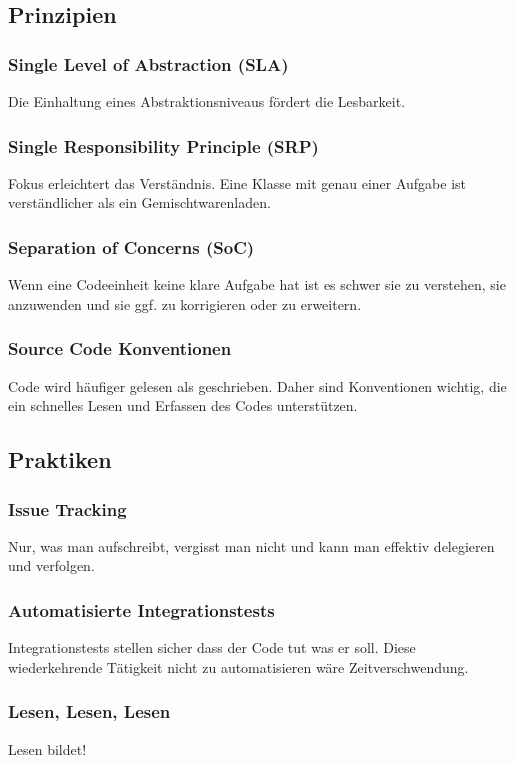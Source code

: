 \documentclass[a5paper, landscape,11pt]{article}
\begin{document}
	\newpage
	\begin{minipage}[t]{.5\textwidth}
		\subsection*{Prinzipien}
		\subsubsection*{Single Level of Abstraction (SLA)}
		Die Einhaltung eines Abstraktionsniveaus fördert die Lesbarkeit.
		\subsubsection*{Single Responsibility Principle (SRP)}
		Fokus erleichtert das Verständnis. Eine Klasse mit genau einer Aufgabe ist verständlicher als ein Gemischtwarenladen.
		\subsubsection*{Separation of Concerns (SoC)}
		Wenn eine Codeeinheit keine klare Aufgabe hat ist es schwer sie zu verstehen, sie anzuwenden und sie ggf. zu korrigieren oder zu erweitern.
		\subsubsection*{Source Code Konventionen}
		Code wird häufiger gelesen als geschrieben. Daher sind Konventionen wichtig, die ein schnelles Lesen und Erfassen des Codes unterstützen.
	\end{minipage}
	\hspace{0.5cm}
	\begin{minipage}[t]{.5\textwidth}
		\subsection*{Praktiken}
		\subsubsection*{Issue Tracking}
		Nur, was man aufschreibt, vergisst man nicht und kann man effektiv delegieren und verfolgen.
		\subsubsection*{Automatisierte Integrationstests}
		Integrationstests stellen sicher dass der Code tut was er soll. Diese wiederkehrende Tätigkeit nicht zu automatisieren wäre Zeitverschwendung.
		\subsubsection*{Lesen, Lesen, Lesen}
		Lesen bildet!
	\end{minipage}
\end{document}

